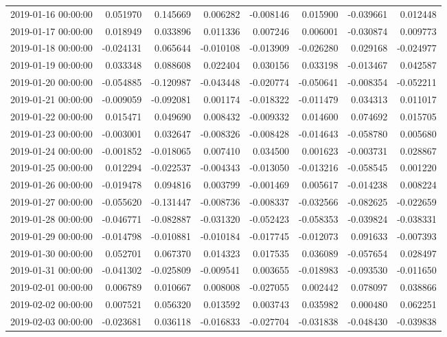 \begin{tabular}{lrrrrrrr}
2019-01-16 00:00:00 & 0.051970 & 0.145669 & 0.006282 & -0.008146 & 0.015900 & -0.039661 & 0.012448 \\
2019-01-17 00:00:00 & 0.018949 & 0.033896 & 0.011336 & 0.007246 & 0.006001 & -0.030874 & 0.009773 \\
2019-01-18 00:00:00 & -0.024131 & 0.065644 & -0.010108 & -0.013909 & -0.026280 & 0.029168 & -0.024977 \\
2019-01-19 00:00:00 & 0.033348 & 0.088608 & 0.022404 & 0.030156 & 0.033198 & -0.013467 & 0.042587 \\
2019-01-20 00:00:00 & -0.054885 & -0.120987 & -0.043448 & -0.020774 & -0.050641 & -0.008354 & -0.052211 \\
2019-01-21 00:00:00 & -0.009059 & -0.092081 & 0.001174 & -0.018322 & -0.011479 & 0.034313 & 0.011017 \\
2019-01-22 00:00:00 & 0.015471 & 0.049690 & 0.008432 & -0.009332 & 0.014600 & 0.074692 & 0.015705 \\
2019-01-23 00:00:00 & -0.003001 & 0.032647 & -0.008326 & -0.008428 & -0.014643 & -0.058780 & 0.005680 \\
2019-01-24 00:00:00 & -0.001852 & -0.018065 & 0.007410 & 0.034500 & 0.001623 & -0.003731 & 0.028867 \\
2019-01-25 00:00:00 & 0.012294 & -0.022537 & -0.004343 & -0.013050 & -0.013216 & -0.058545 & 0.001220 \\
2019-01-26 00:00:00 & -0.019478 & 0.094816 & 0.003799 & -0.001469 & 0.005617 & -0.014238 & 0.008224 \\
2019-01-27 00:00:00 & -0.055620 & -0.131447 & -0.008736 & -0.008337 & -0.032566 & -0.082625 & -0.022659 \\
2019-01-28 00:00:00 & -0.046771 & -0.082887 & -0.031320 & -0.052423 & -0.058353 & -0.039824 & -0.038331 \\
2019-01-29 00:00:00 & -0.014798 & -0.010881 & -0.010184 & -0.017745 & -0.012073 & 0.091633 & -0.007393 \\
2019-01-30 00:00:00 & 0.052701 & 0.067370 & 0.014323 & 0.017535 & 0.036089 & -0.057654 & 0.028497 \\
2019-01-31 00:00:00 & -0.041302 & -0.025809 & -0.009541 & 0.003655 & -0.018983 & -0.093530 & -0.011650 \\
2019-02-01 00:00:00 & 0.006789 & 0.010667 & 0.008008 & -0.027055 & 0.002442 & 0.078097 & 0.038866 \\
2019-02-02 00:00:00 & 0.007521 & 0.056320 & 0.013592 & 0.003743 & 0.035982 & 0.000480 & 0.062251 \\
2019-02-03 00:00:00 & -0.023681 & 0.036118 & -0.016833 & -0.027704 & -0.031838 & -0.048430 & -0.039838 \\

\end{tabular}
